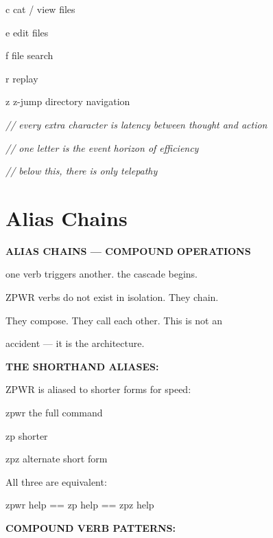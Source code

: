 \documentclass[11pt,a4paper,twoside]{book}
\begin{document}
c   cat / view files

e   edit files

f   file search

r   replay

z   z-jump directory navigation

{\small\itshape\color{dimtext} // every extra character is latency between thought and action}

{\small\itshape\color{dimtext} // one letter is the event horizon of efficiency}

{\small\itshape\color{dimtext} // below this, there is only telepathy}


\vspace{16pt}

\section{Alias Chains}


\vspace{10pt}
{\large\bfseries\color{neoncyan} ALIAS CHAINS — COMPOUND OPERATIONS}\vspace{6pt}

one verb triggers another. the cascade begins.

ZPWR verbs do not exist in isolation. They chain.

They compose. They call each other. This is not an

accident — it is the architecture.


\vspace{12pt}
{\bfseries\color{neonyellow} THE SHORTHAND ALIASES:}\vspace{4pt}

ZPWR is aliased to shorter forms for speed:

\begin{codebox}
zpwr   the full command\\
\end{codebox}

zp     shorter

zpz    alternate short form

All three are equivalent:

\begin{codebox}
zpwr help  ==  zp help  ==  zpz help\\
\end{codebox}


\vspace{12pt}
{\bfseries\color{neonyellow} COMPOUND VERB PATTERNS:}\vspace{4pt}
\end{document}
